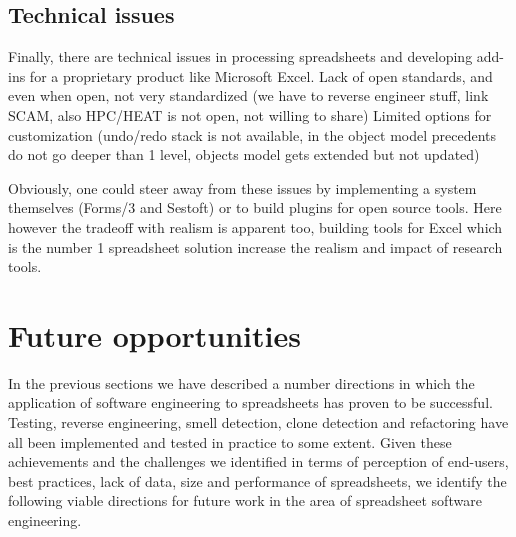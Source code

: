 \documentclass[conference]{IEEEtran}
\begin{document}


\subsection{Technical issues} 
Finally, there are technical issues in processing spreadsheets and developing add-ins for a proprietary product like Microsoft Excel. 
Lack of open standards, and even when open, not very standardized (we have to reverse engineer stuff, link SCAM, also HPC/HEAT is not open, not willing to share)
Limited options for customization (undo/redo stack is not available, in the object model precedents do not go deeper than 1 level, objects model gets extended but not updated)

Obviously, one could steer away from these issues by implementing a system themselves (Forms/3 and Sestoft) or to build plugins for open source tools. Here however the tradeoff with realism is apparent too, building tools for Excel which is the number 1 spreadsheet solution increase the realism and impact of research tools.

\section{Future opportunities}
In the previous sections we have described a number directions in which the application of software engineering to spreadsheets  has proven to be successful. Testing, reverse engineering, smell detection, clone detection and refactoring have all been implemented and tested in practice to some extent. Given these achievements and the challenges we identified in terms of perception of end-users, best practices, lack of data, size and performance of spreadsheets, we identify the following viable directions for future work in the area of spreadsheet software engineering.

\end{document}
